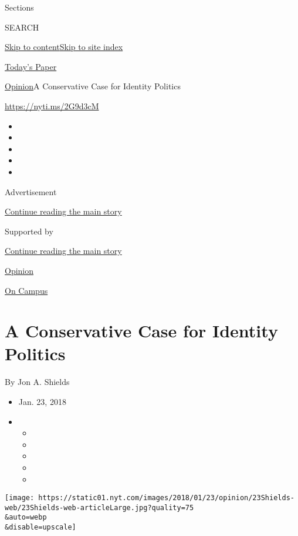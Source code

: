 Sections

SEARCH

\protect\hyperlink{site-content}{Skip to
content}\protect\hyperlink{site-index}{Skip to site index}

\href{https://myaccount.nytimes.com/auth/login?response_type=cookie\&client_id=vi}{}

\href{https://www.nytimes.com/section/todayspaper}{Today's Paper}

\href{/section/opinion}{Opinion}\textbar{}A Conservative Case for
Identity Politics

\href{https://nyti.ms/2G9d3cM}{https://nyti.ms/2G9d3cM}

\begin{itemize}
\item
\item
\item
\item
\item
\end{itemize}

Advertisement

\protect\hyperlink{after-top}{Continue reading the main story}

Supported by

\protect\hyperlink{after-sponsor}{Continue reading the main story}

\href{/section/opinion}{Opinion}

\href{/column/on-campus}{On Campus}

\hypertarget{a-conservative-case-for-identity-politics}{%
\section{A Conservative Case for Identity
Politics}\label{a-conservative-case-for-identity-politics}}

By Jon A. Shields

\begin{itemize}
\item
  Jan. 23, 2018
\item
  \begin{itemize}
  \item
  \item
  \item
  \item
  \item
  \end{itemize}
\end{itemize}

\texttt{[image: https://static01.nyt.com/images/2018/01/23/opinion/23Shields-web/23Shields-web-articleLarge.jpg?quality=75\\\&auto=webp\\\&disable=upscale]}

